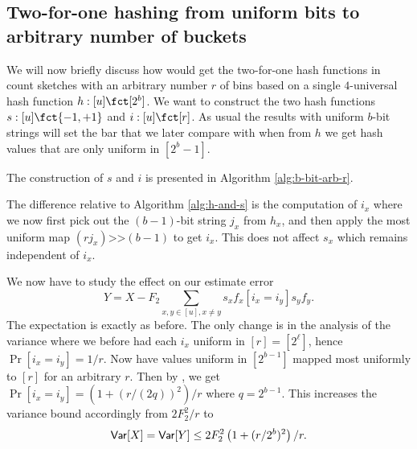 \subsection{Two-for-one hashing from uniform bits to arbitrary number of buckets}
We will now briefly discuss how would get the two-for-one hash
functions in count sketches with an arbitrary number $r$ of bins based
on a single $4$-universal hash function $h:[u]\fct [2^b]$.  We want to
construct the two hash functions $s:[u]\fct\{-1,+1\}$ and
$i:[u]\fct[r]$. As usual the results with uniform $b$-bit strings will
set the bar that we later compare with when from $h$ we get hash values that
are only uniform in $[2^b-1]$.

The construction of $s$ and $i$ is presented in 
Algorithm \ref{alg:b-bit-arb-r}.
The difference relative to Algorithm \ref{alg:h-and-s} is the computation
of $i_x$ where we now first pick out the $(b-1)$-bit string $j_x$ from
$h_x$, and then apply the most uniform map $(rj_x)\texttt{>>}(b-1)$
to get $i_x$. This does not affect $s_x$ which remains independent
of $i_x$. 

We now have to study the effect on our estimate error
\[Y=X-F_2\sum_{x,y\in[u],x\neq y} s_x f_x[i_x=i_y]s_y f_y.\]
The expectation is exactly as before. The only
change is in the analysis of the variance where
we before had each $i_x$ uniform in $[r]=[2^\ell]$, hence
$\Pr[i_x=i_y]=1/r$. Now have values uniform in $[2^{b-1}]$ mapped
most uniformly to $[r]$ for an arbitrary $r$. Then by ,
we get $\Pr[i_x=i_y]=\left(1+(r/(2q))^2\right)/r$ where $q=2^{b-1}$. 
This increases
the variance bound accordingly from $2F_2^2/r$ to
\begin{equation}\label{eq:Var-b-bit-arb-r}
{\sf Var}[X]={\sf Var}[Y]\leq 2F_2^2\left(1+(r/2^b)^2\right)/r.
\end{equation}


